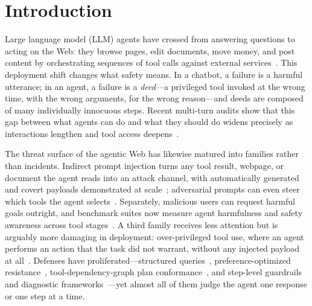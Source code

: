 \section{Introduction}
\label{sec:intro}

Large language model (LLM) agents have crossed from answering questions to acting on the Web: they browse pages, edit documents, move money, and post content by orchestrating sequences of tool calls against external services~\cite{debenedetti2024agentdojo,bai2026harnessrisk}. This deployment shift changes what safety means. In a chatbot, a failure is a harmful utterance; in an agent, a failure is a \emph{deed}---a privileged tool invoked at the wrong time, with the wrong arguments, for the wrong reason---and deeds are composed of many individually innocuous steps. Recent multi-turn audits show that this gap between what agents can do and what they should do widens precisely as interactions lengthen and tool access deepens~\cite{li2026unsafer}.

The threat surface of the agentic Web has likewise matured into families rather than incidents. Indirect prompt injection turns any tool result, webpage, or document the agent reads into an attack channel, with automatically generated and covert payloads demonstrated at scale~\cite{wang2026landscape,wang2025webinject,liu2024automatic,lee2026will}; adversarial prompts can even steer which tools the agent selects~\cite{shi2025prompt}. Separately, malicious users can request harmful goals outright, and benchmark suites now measure agent harmfulness and safety awareness across tool stages~\cite{andriushchenko2024agentharm,ye2024toolsword,yuan2024rjudge}. A third family receives less attention but is arguably more damaging in deployment: over-privileged tool use, where an agent performs an action that the task did not warrant, without any injected payload at all~\cite{yang2026when}. Defenses have proliferated---structured queries~\cite{chen2024struq}, preference-optimized resistance~\cite{chen2024secalign}, tool-dependency-graph plan conformance~\cite{an2025ipiguard}, and step-level guardrails and diagnostic frameworks~\cite{mou2026toolsafe,liu2026agentdog,hossain2026nexus,chen2025agentguard}---yet almost all of them judge the agent one response or one step at a time.

